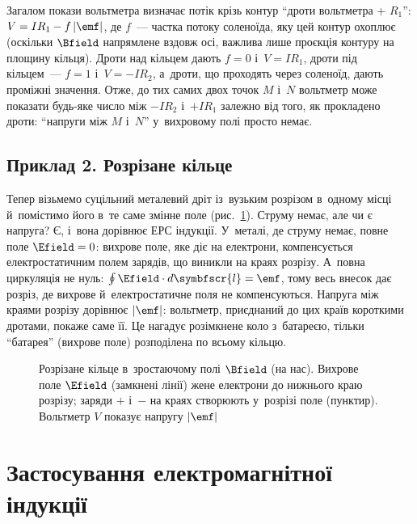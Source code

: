 Загалом покази вольтметра визначає потік крізь контур \enquote{дроти вольтметра + $R_1$}: $V=IR_1-f\,|\emf|$, де $f$~--- частка потоку соленоїда, яку цей контур охоплює
(оскільки $\Bfield$ напрямлене вздовж осі, важлива лише проєкція контуру на площину кільця). Дроти над кільцем дають $f=0$ і~$V=IR_1$, дроти під кільцем~--- $f=1$ і~$V=-IR_2$,
а~дроти, що проходять через соленоїд, дають проміжні значення. Отже, до тих самих двох точок $M$ і~$N$ вольтметр може показати будь-яке число між $-IR_2$ і~$+IR_1$ залежно від того, як прокладено
дроти: \enquote{напруги між $M$ і~$N$} у~вихровому полі просто немає.

\subsection*{Приклад 2. Розрізане кільце}

Тепер візьмемо суцільний металевий дріт із~вузьким розрізом в~одному місці й~помістимо його в~те саме змінне поле (рис.~\ref{pic:truncated_ring}). Струму немає, але чи є напруга? Є, і~вона дорівнює ЕРС
індукції. У~металі, де струму немає, повне поле $\Efield=0$: вихрове поле, яке діє на електрони, компенсується електростатичним полем зарядів, що виникли на краях розрізу.
А~повна циркуляція не нуль: $\oint\Efield\cdot d\symbfscr{l}=\emf$, тому весь внесок дає розріз, де вихрове й~електростатичне поля не компенсуються. Напруга між краями розрізу
дорівнює $|\emf|$: вольтметр, приєднаний до цих країв короткими дротами, покаже саме її. Це нагадує розімкнене коло з~батареєю, тільки \enquote{батарея} (вихрове поле)
розподілена по всьому кільцю.

\begin{figure}\centering
	\caption{Розрізане кільце в~зростаючому полі $\Bfield$ (на нас). Вихрове поле $\Efield$ (замкнені лінії) жене електрони до нижнього краю розрізу; заряди $+$ і~$-$ на краях створюють у~розрізі поле (пунктир). Вольтметр $V$ показує напругу $|\emf|$\label{pic:truncated_ring}}
\end{figure}

\section{Застосування електромагнітної індукції}\hypertarget{induction-applications}{}

